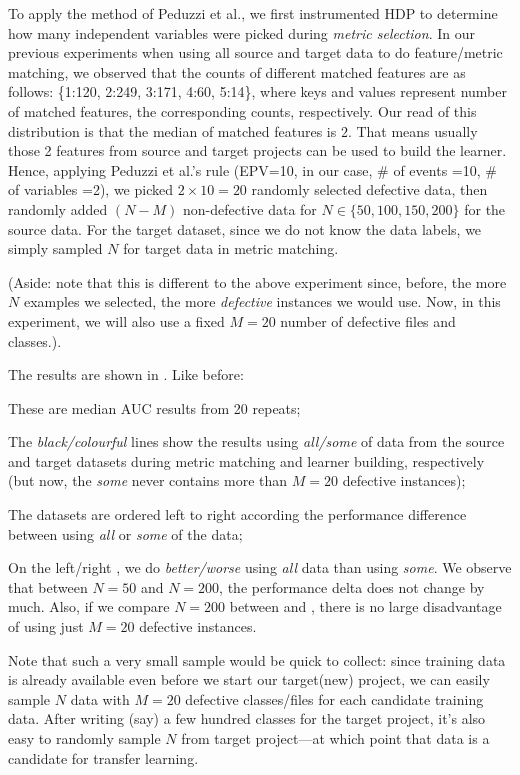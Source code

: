   To apply the method of Peduzzi et al., we first instrumented HDP to determine how many
  independent variables were picked during {\em metric  selection}. In our previous experiments when using all source and target data to do feature/metric matching, we observed that the counts of different matched features are as follows: \{1:120, 2:249, 3:171, 4:60, 5:14\}, where keys and values represent number of matched features, the corresponding counts, respectively. Our read of this distribution is that the median of matched features is $2$. That means usually those 2 features from source and target projects can be used to build the learner. Hence, applying  Peduzzi et al.'s rule (EPV=10,  in our case, \# of events =10, \# of variables =2), we picked $2\times 10=20$ %
  randomly selected defective data, then randomly added $(N-M)$ non-defective data for
  $N\in \{50,100,150,200\}$ for the source data. For the target dataset, since we do not
  know the data labels, we simply sampled $N$ for target data in metric matching.

  (Aside: note that this is different to the above experiment since, before, the more $N$ examples
  we selected, the more {\em defective} instances we would use. Now, in this experiment, we will also
  use a fixed $M=20$ number of defective files and classes.).

  The results are shown in . Like before:
\squishlist
  \item These are median AUC results from 20 repeats;
\item
  The {\em black/colourful} lines show the results using {\em all/some} of  data from
  the source and target datasets during metric matching and learner building, respectively
  (but now, the {\em some} never contains more than $M=20$ defective instances);
\item
  The datasets are ordered left to right according
  the performance difference between using
   {\em all} or {\em some} of the data;
   \item
     On the left/right ,  we do {\em better/worse} using
  {\em all} data than using {\em some}.
\squishend
  We observe that between $N=50$ and $N=200$, the performance delta
  does not change by much. Also, if we compare $N=200$ between 
  and , there is no large disadvantage of using just
  $M=20$ defective instances.

  Note that such a very small sample would be quick to collect: since training data is already available even before we start our target(new) project, we can easily sample $N$ data with $M=20$ defective classes/files for each candidate training data. After writing (say) a few
  hundred classes for the target project, it's also easy to randomly sample $N$ from target project---at which point that data is a candidate for transfer learning.
